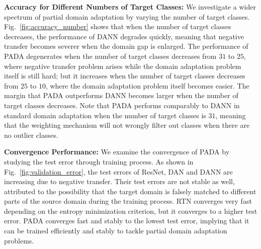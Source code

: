 \documentclass[runningheads]{llncs}
\begin{document}
\textbf{Accuracy for Different Numbers of Target Classes:}
We investigate a wider spectrum of partial domain adaptation by varying the number of target classes. Fig.~\ref{fig:accuracy_number} shows that when the number of target classes decreases, the performance of DANN degrades quickly, meaning that negative transfer becomes severer when the domain gap is enlarged. The performance of PADA degenerates when the number of target classes decreases from $31$ to $25$, where negative transfer problem arises while the domain adaptation problem itself is still hard; but it increases when the number of target classes decreases from $25$ to $10$, where the domain adaptation problem itself becomes easier. The margin that PADA outperforms DANN becomes larger when the number of target classes decreases. Note that PADA performs comparably to DANN in standard domain adaptation when the number of target classes is $31$, meaning that the weighting mechanism will not wrongly filter out classes when there are no outlier classes.

\textbf{Convergence Performance:}
We examine the convergence of PADA by studying the test error through training process. As shown in Fig.~\ref{fig:validation_error}, the test errors of ResNet, DAN and DANN are increasing due to negative transfer. Their test errors are not stable as well, attributed to the possibility that the target domain is falsely matched to different parts of the source domain during the training process.  RTN converges very fast depending on the entropy minimization criterion, but it converges to a higher test error. PADA converges fast and stably to the lowest test error, implying that it can be trained efficiently and stably to tackle partial domain adaptation problems. 
\end{document}
